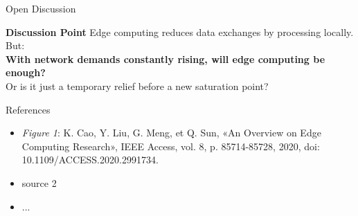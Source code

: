\documentclass{beamer}
\begin{document}
\begin{frame}{Open Discussion}
  \begin{block}{\textbf{Discussion Point}}
    Edge computing reduces data exchanges by processing locally. But:\\
    \textbf{With network demands constantly rising, will edge computing be enough?}\\
    Or is it just a temporary relief before a new saturation point?
  \end{block}
\end{frame}

\begin{frame}{References}
    \begin{itemize}
        \item \textit{Figure 1}: K. Cao, Y. Liu, G. Meng, et Q. Sun, «An Overview on Edge Computing Research», IEEE Access, vol. 8, p. 85714-85728, 2020, doi: 10.1109/ACCESS.2020.2991734.
        \item source 2
        \item ...
      \end{itemize}
\end{frame}
\end{document}
